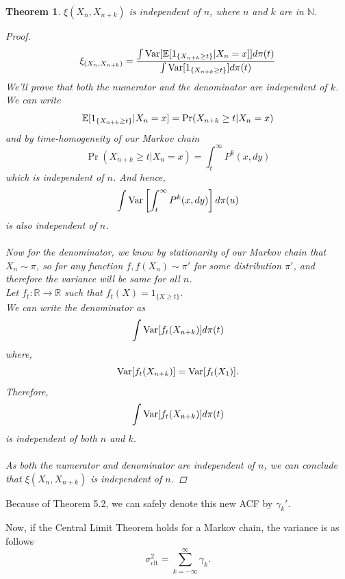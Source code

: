 \documentclass{article}
\newtheorem{theorem}{Theorem}[section]
\begin{document}
	\begin{theorem}
		$\xi(X_n, X_{n+k})$ is independent of $n$, where $n$ and $k$ are in $\mathbb{N}$.
		\begin{proof}
			\begin{equation}
				\xi_{(X_n, X_{n+k})} = \frac{\int \text{Var}[\mathbb{E}[1_{\{X_{n+k} \geq t\}}|X_n=x]] d\pi(t)}{\int \text{Var}[1_{\{X_{n+k} \geq t\}}] d\pi(t)}
			\end{equation}
			We'll prove that both the numerator and the denominator are independent of $k$. \\
			We can write
			\begin{equation*}
				\mathbb{E}[1_{\{X_{n+k} \geq t\}}|X_n=x] = \Pr(X_{n+k} \geq t|X_n=x) \\
			\end{equation*}
			and by time-homogeneity of our Markov chain
			\begin{equation*}
				\Pr(X_{n+k} \geq t|X_n=x) = \int_t^{\infty} P^k(x, dy)
			\end{equation*}
			which is independent of $n$. And hence,
			\begin{equation}
				\int \text{Var}\left[ \int_t^{\infty} P^k(x, dy)\right] d\pi(u)
			\end{equation}
			is also independent of $n$.\\\\
			Now for the denominator, we know by stationarity of our Markov chain that $X_n \sim \pi$, so for any function $f, f(X_n) \sim \pi'$ for some distribution $\pi'$, and therefore the variance will be same for all $n$.\\
			Let $f_t: \mathbb{R} \rightarrow \mathbb{R}$ such that $f_t(X) = 1_{\{X \geq t\}}$.\\
			We can write the denominator as
			$$\int \text{Var}[f_t(X _{n+k})] d\pi(t)$$
			where,
			$$\text{Var}[f_t(X_{n+k})] = \text{Var}[f_t(X_{1})].$$
			Therefore,
			$$\int \text{Var}[f_t(X_{n+k})] d\pi(t)$$
			is independent of both $n$ and $k$.\\\\
			As both the numerator and denominator are independent of $n$, we can conclude that $\xi(X_n, X_{n+k})$ is independent of $n$.
		\end{proof}
	\end{theorem}
	Because of Theorem 5.2, we can safely denote this new ACF by $\gamma_k'$.

	Now, if the Central Limit Theorem holds for a Markov chain, the variance is as follows
	$$\sigma_{\text{clt}}^2 = \sum_{k=-\infty}^{\infty} \gamma_k.$$
\end{document}
